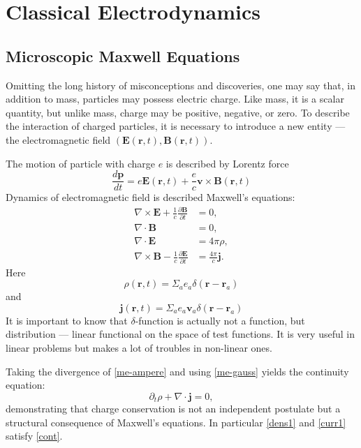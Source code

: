 \chapter{Classical Electrodynamics}
\label{ch:ed}
\section{Microscopic Maxwell Equations}
\label{sec:ed-micro-maxwell-eqs}

Omitting the long history of misconceptions and discoveries, 
one may say that, in addition to mass, particles may possess 
electric charge. Like mass, it is a scalar quantity, but unlike mass, 
charge may be positive, negative, or zero.
To describe the interaction of charged particles, 
it is necessary to introduce a new entity --- the electromagnetic field $ (\bm E(\bm r,t),\bm B(\bm r,t)) $.

The motion of  particle with charge $ e $ is described by Lorentz force
\begin{equation}
   \label {lorentz-force}
   \frac{d \bm p}{d t}=e \bm E(\bm r,t) + \frac{e}{c}\bm v \times \bm B(\bm r,t)
\end{equation}
Dynamics of electromagnetic field is described   Maxwell’s equations:
\begin{align}
\nabla \times \bm{E} + \frac{1}{c}\frac{\partial \bm{B}}{\partial t} &= 0, \label{me-faraday} \\
\nabla \cdot \bm{B} &= 0, \label{me-monopole} \\
\nabla \cdot \bm{E} &= 4\pi \rho, \label{me-gauss} \\
\nabla \times \bm{B} - \frac{1}{c}\frac{\partial \bm{E}}{\partial t} &= \frac{4\pi}{c}\bm{j}. \label{me-ampere}
\end{align}
Here 
\begin{equation}
   \label {dens1}
    \rho(\bm r,t)=\Sigma_a e_a \delta (\bm r-\bm r_a)
\end{equation}
and
\begin{equation}
   \label {curr1}
    \bm j(\bm r,t)=\Sigma_a e_a \bm v_a \delta (\bm r-\bm r_a)
\end{equation}
It is important to know that $ \delta $-function is actually not a function, but distribution
--- linear functional on the space of test functions. It is very useful in linear problems
but makes a lot of troubles in non-linear ones.

Taking the divergence of \eqref{me-ampere} and using \eqref{me-gauss} 
yields the continuity equation:
\begin{equation}
    \label{cont}
\partial_t \rho + \nabla \cdot \bm{j} = 0,
\end{equation}
demonstrating that charge conservation is not an independent 
postulate but a structural consequence of Maxwell’s equations.
In particular \eqref{dens1} and \eqref{curr1} satisfy \eqref{cont}.

